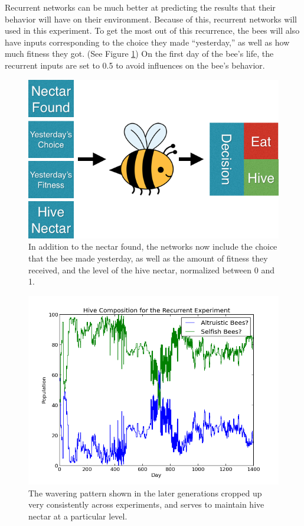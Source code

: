 \documentclass[twoside]{article}
\begin{document}
\begin{multicols}{2}
			Recurrent networks can be much better at predicting the results that their behavior will have on their environment. Because of this, recurrent networks will used in this experiment. To get the most out of this recurrence, the bees will also have inputs corresponding to the choice they made ``yesterday,'' as well as how much fitness they got. (See Figure \ref{fig:recurrent_system}) On the first day of the bee's life, the recurrent inputs are set to 0.5 to avoid influences on the bee's behavior.


			\begin{figure}[H]
				\begin{center}
					\includegraphics[width=.45\textwidth]{bee_diagrams/recurrent_system.png}
				\end{center}
				\caption{In addition to the nectar found, the networks now include the choice that the bee made yesterday, as well as the amount of fitness they received, and the level of the hive nectar, normalized between 0 and 1.}
				\label{fig:recurrent_system}
			\end{figure}

			\begin{figure}[H]
				\begin{center}
					\includegraphics[width=.5\textwidth]{results/recurrent_comp.png}
				\end{center}
				\caption{The wavering pattern shown in the later generations cropped up very consistently across experiments, and serves to maintain hive nectar at a particular level.}
				\label{fig:recurrent_composition}
			\end{figure}


\end{multicols}
\end{document}

